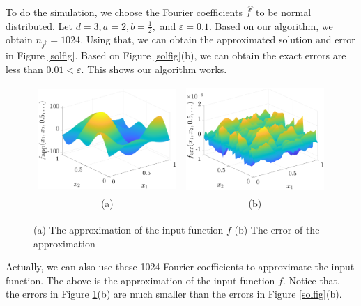 \documentclass[final]{elsarticle}
\theoremstyle{definition}
\theoremstyle{remark}
\begin{document}
To do the simulation, we choose the Fourier coefficients $\widehat{f}$ to be normal distributed. Let $d=3, a= 2, b=\frac{1}{2},$ and $\varepsilon = 0.1.$ Based on our algorithm, we obtain $ n_{j^\dagger} = 1024.$ Using that, we can obtain the approximated solution and error in Figure \ref{solfig}. Based on Figure \ref{solfig}(b), we can obtain the exact errors are less than $0.01 < \varepsilon $.  This shows our algorithm works.

\begin{figure}[ht]
	\centering
	\begin{tabular}{cc}
		\includegraphics[width = 5.5 cm]{ProgramsImages/SimDirectInpFunAppx.eps}& 
		\includegraphics[width = 5.5 cm]{ProgramsImages/SimDirectInpFunErr.eps}
		\\ (a) & (b)
	\end{tabular}
	\caption{(a) The approximation of the input function $f$
		(b) The error of the approximation 
		\label{inpfig}} %
\end{figure}

Actually, we can also use these 1024 Fourier coefficients to approximate the input function. The above is the approximation of the input function $f$. Notice that, the errors in Figure \ref{inpfig}(b) are much smaller than the errors in Figure \ref{solfig}(b). 
\end{document}
